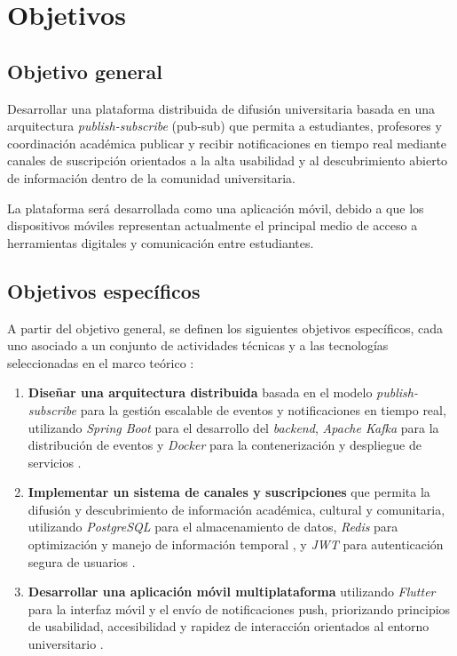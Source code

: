 \section{Objetivos}

\subsection{Objetivo general}

Desarrollar una plataforma distribuida de difusión universitaria basada en una arquitectura \textit{publish-subscribe} (pub-sub) que permita a estudiantes, profesores y coordinación académica publicar y recibir notificaciones en tiempo real mediante canales de suscripción orientados a la alta usabilidad y al descubrimiento abierto de información dentro de la comunidad universitaria.

La plataforma será desarrollada como una aplicación móvil, debido a que los dispositivos móviles representan actualmente el principal medio de acceso a herramientas digitales y comunicación entre estudiantes.

\subsection{Objetivos específicos}

A partir del objetivo general, se definen los siguientes objetivos específicos, cada uno asociado a un conjunto de actividades técnicas y a las tecnologías seleccionadas en el marco teórico \cite{tanenbaum2023distributed, tarkoma2012publish}:

\begin{enumerate}
    \item \textbf{Diseñar una arquitectura distribuida} basada en el modelo \textit{publish-subscribe} para la gestión escalable de eventos y notificaciones en tiempo real, utilizando \textit{Spring Boot} para el desarrollo del \textit{backend}, \textit{Apache Kafka} para la distribución de eventos y \textit{Docker} para la contenerización y despliegue de servicios \cite{kafka2017streaming, spring2023boot}.
    
    \item \textbf{Implementar un sistema de canales y suscripciones} que permita la difusión y descubrimiento de información académica, cultural y comunitaria, utilizando \textit{PostgreSQL} para el almacenamiento de datos, \textit{Redis} para optimización y manejo de información temporal \cite{postgresql2024docs}, y \textit{JWT} para autenticación segura de usuarios \cite{jwt2015rfc}.
    
    \item \textbf{Desarrollar una aplicación móvil multiplataforma} utilizando \textit{Flutter} para la interfaz móvil y el envío de notificaciones push, priorizando principios de usabilidad, accesibilidad y rapidez de interacción orientados al entorno universitario \cite{flutter2024docs, amexcomp2020ihc}.
\end{enumerate}

